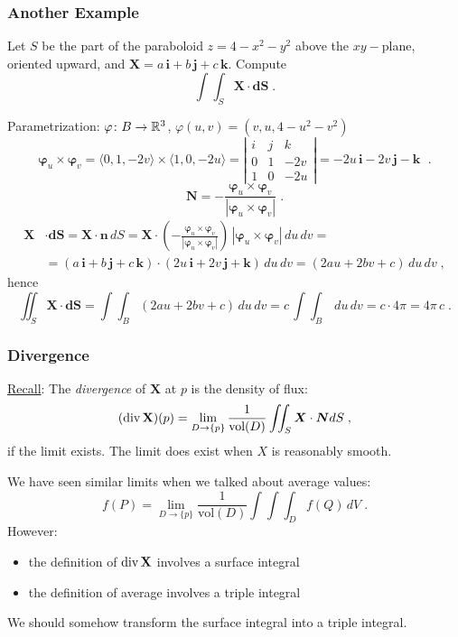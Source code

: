 \begin{frame}
  \frametitle{Another Example}

  Let $S$ be the part of the paraboloid $z=4-x^2-y^2$ above the $xy-$plane, oriented upward, and $\textbf{X} = a\, \textbf{i} + b\, \textbf{j} + c\, \textbf{k}$. Compute
%
$$\int\!\!\!\int_S \textbf{X} \cdot \textbf{dS} \; .$$

\pause Parametrization: $\varphi \colon B \to {\mathbb{R}}^3$, $\varphi(u,v) = (v,u,4-u^2-v^2)$
%
$$\bm{\varphi}_u \times \bm{\varphi}_v = \langle 0,1,-2v\rangle \times \langle 1,0,-2u\rangle = \left| \begin{array}{ccc}
i & j & k \\
0 & 1 & -2v\\
1 & 0 & -2u
\end{array}\right| = -2u \, \textbf{i} - 2v\, \textbf{j} - \textbf{k }\; .$$
%
$$\textbf{N} = -\frac{\bm{\varphi}_u \times \bm{\varphi}_v}{|\bm{\varphi}_u \times \bm{\varphi}_v|}\; .$$
%
\begin{align*}
  \textbf{X} &\cdot \textbf{dS}  = \textbf{X} \cdot \textbf{n} \, dS =  \textbf{X} \cdot \left( -\frac{\bm{\varphi}_u \times \bm{\varphi}_v}{|\bm{\varphi}_u \times \bm{\varphi}_v|}\right) \, |\bm{\varphi}_u \times \bm{\varphi}_v| \, du\, dv = \\
  & = (a\, \textbf{i} +b\, \textbf{j} +c\, \textbf{k}) \cdot (2u \, \textbf{i} + 2v\, \textbf{j} + \textbf{k}) \, du\, dv = (2au +2bv +c)\, du\, dv\; ,
\end{align*}
%
hence
%
$$\iint_S \textbf{X} \cdot \textbf{dS} = \int\!\!\!\int_B (2au +2bv +c)\, du\, dv = c\,\int\!\!\!\int_B \, du\, dv = c \cdot 4\pi = 4\pi\, c\; .$$
\end{frame}

\begin{frame}
  \frametitle{Divergence}

\underline{Recall}: The \emph{divergence} of $\textbf{X}$ at $p$ is the density of flux:
%
$$(\operatorname{div} \textbf{X})(p) = \lim_{D\to \{p\}} \frac{1}{\text{vol}(D)} \int\!\!\!\int_S \bm{X} \cdot \bm{N}dS \; ,$$
%
if the limit exists. \pause The limit does exist when $X$ is reasonably smooth.

\pause We have seen similar limits when we talked about average values:
%
$$f(P) = \lim_{D\to\{p\}} \frac{1}{\text{vol}(D)} \int\!\!\!\!\int\!\!\!\!\int_D f(Q)\, dV\; .$$
%
\pause However:
\begin{itemize}
  \item the definition of $\operatorname{div} \textbf{X}$ involves a surface integral
  \item the definition of average involves a triple integral
\end{itemize}

\pause We should somehow transform the surface integral into a triple integral.
\end{frame}

